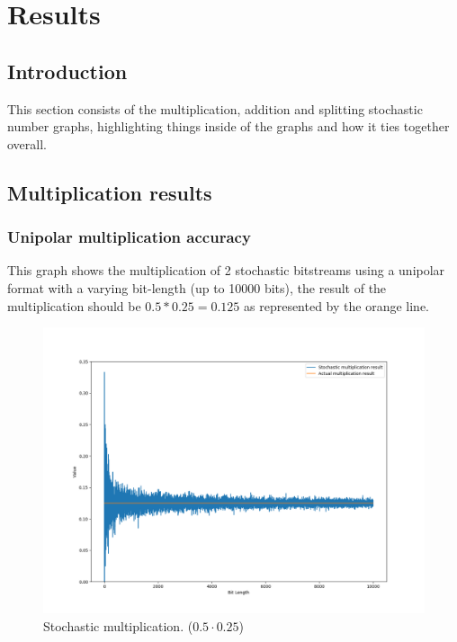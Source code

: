 \documentclass[a4paper,oneside,phd,etd]{BYUPhys}
\begin{document}
\chapter{Results}

\section{Introduction}
This section consists of the multiplication, addition and splitting stochastic number graphs, highlighting things inside of the graphs and how it ties together overall.

\section{Multiplication results}
\subsection{Unipolar multiplication accuracy}
This graph shows the multiplication of 2 stochastic bitstreams using a unipolar format with a varying bit-length (up to 10000 bits), the result of the multiplication should be $0.5*0.25=0.125$ as represented by the orange line.
\begin{figure}[H]
\centering
\includegraphics[scale=0.4]{results/mult.png}
\caption{Stochastic multiplication. ($0.5\cdot 0.25$)}
\label{fig:mult}
\end{figure}
\end{document}
